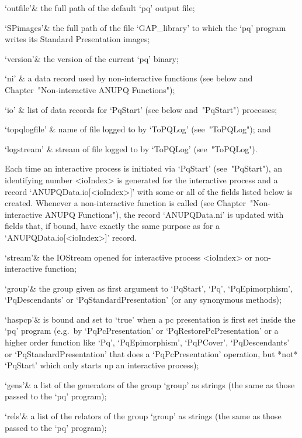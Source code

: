 \quad`outfile'& the full path of the default `pq' output  file;

\quad`SPimages'& the full path of the file  `GAP_library'  to  which  the
`pq' program writes its Standard Presentation images;

\quad`version'& the version of the current `pq' binary;

\quad`ni' & a data record used by non-interactive  functions  (see  below
and Chapter~"Non-interactive ANUPQ Functions");

\quad`io' & list of data records for `PqStart' (see below  and~"PqStart")
processes;

\quad`topqlogfile' & name of file logged to by `ToPQLog' (see~"ToPQLog");
and

\quad`logstream' & stream of file logged to by `ToPQLog' (see~"ToPQLog").

\enditems

Each time an interactive {\ANUPQ}  process  is  initiated  via  `PqStart'
(see~"PqStart"), an identifying number <ioIndex>  is  generated  for  the
interactive process and a record `ANUPQData.io[<ioIndex>]' with  some  or
all of the fields listed below is  created.  Whenever  a  non-interactive
function is called (see Chapter~"Non-interactive ANUPQ  Functions"),  the
record `ANUPQData.ni' is updated with fields that, if bound, have exactly
the same purpose as for a `ANUPQData.io[<ioIndex>]' record. 

\beginitems

\quad`stream'& the  IOStream  opened  for  interactive  {\ANUPQ}  process
<ioIndex> or non-interactive {\ANUPQ} function;

\quad`group'& the group given  as  first  argument  to  `PqStart',  `Pq',
`PqEpimorphism',  `PqDescendants'  or  `PqStandardPresentation'  (or  any
synonymous methods);

\quad`haspcp'& is bound and set to `true' when a pc presentation is first
set   inside   the   `pq'   program   (e.g.~by   `PqPcPresentation'    or
`PqRestorePcPresentation'  or  a  higher  order   function   like   `Pq',
`PqEpimorphism', `PqPCover', `PqDescendants' or  `PqStandardPresentation'
that does a `PqPcPresentation' operation, but *not* `PqStart' which  only
starts up an interactive {\ANUPQ} process);

\quad`gens'& a list of the generators of the  group  `group'  as  strings
(the same as those passed to the `pq' program);

\quad`rels'& a list of the relators of the group `group' as strings  (the
same as those passed to the `pq' program);

